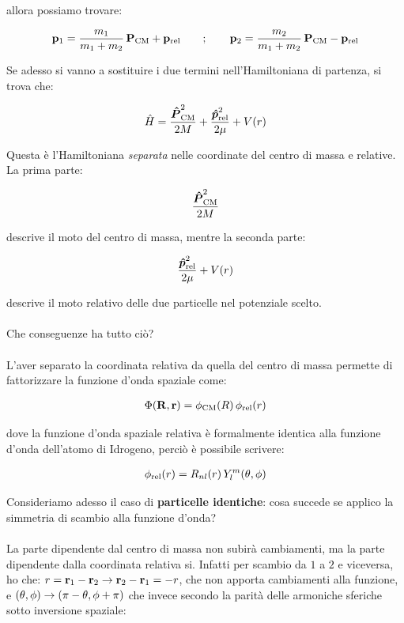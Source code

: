 	allora possiamo trovare:
	
\begin{align*}
	\vb{p}_1 = \frac{m_1}{m_1 + m_2} \, \vb{P}_{\text{CM}} + \vb{p}_{\text{rel}} \qquad ; \qquad \vb{p}_2 = \frac{m_2}{m_1 + m_2} \, \vb{P}_{\text{CM}} - \vb{p}_{\text{rel}}
\end{align*}

	Se adesso si vanno a sostituire i due termini nell'Hamiltoniana di partenza, si trova che:
	
\begin{align*}
	\hat{H} = \frac{\vb*{\hat{P}}^2_{\text{CM}} }{2M} + \frac{\vb*{\hat{p}}^2_{\text{rel}} }{2\mu} + V\qty(r)
\end{align*}

	Questa è l'Hamiltoniana \textit{separata} nelle coordinate del centro di massa e relative. La prima parte:
	
\begin{align*}
	\frac{\vb*{\hat{P}}^2_{\text{CM}}}{2M}
\end{align*}

	descrive il moto del centro di massa, mentre la seconda parte:
	
\begin{align*}
	\frac{\vb*{\hat{p}}^2_{\text{rel}}}{2\mu} + V\qty(r)
\end{align*}
	
	descrive il moto relativo delle due particelle nel potenziale scelto.
	\\
	\\
	Che conseguenze ha tutto ciò?
	\\
	\\
	L'aver separato la coordinata relativa da quella del centro di massa permette di fattorizzare la funzione d'onda spaziale come:
	
\begin{align*}
	\Phi\qty(\vb{R}, \vb{r}) = \phi_{\text{CM}}\qty(R) \, \phi_{\text{rel}}\qty(r)
\end{align*}
	
	dove la funzione d'onda spaziale relativa è formalmente identica alla funzione d'onda dell'atomo di Idrogeno, perciò è possibile scrivere:
	
\begin{align*}
	\phi_{\text{rel}}\qty(r) = R_{nl}\qty(r) \, Y_l^m\qty(\theta, \phi)
\end{align*}
	
	Consideriamo adesso il caso di \textbf{particelle identiche}: cosa succede se applico la simmetria di scambio alla funzione d'onda?
	\\
	\\
	La parte dipendente dal centro di massa non subirà cambiamenti, ma la parte dipendente dalla coordinata relativa si. Infatti per scambio da $1$ a $2$ e viceversa, ho che: $r = \vb{r}_1 - \vb{r}_2 \to \vb{r}_2 - \vb{r}_1 = -r$, che non apporta cambiamenti alla funzione, e $\qty(\theta, \phi) \to \qty(\pi - \theta, \phi + \pi)$ che invece secondo la parità delle armoniche sferiche sotto inversione spaziale:
	
